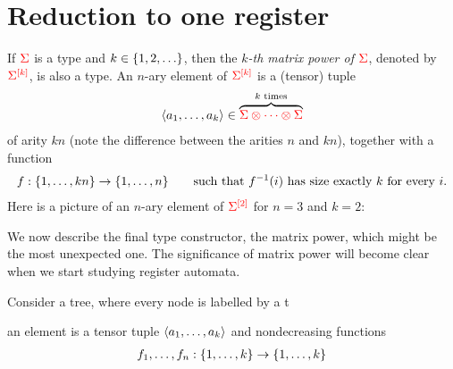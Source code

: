 \section{Reduction to one register}
\label{sec:matrix-power}

\begin{proposition}
    \label{prop:many-register} 
\end{proposition}


\begin{definition}
    If  ${\color{red}{\Sigma}}$ is a type and $k \in \{1,2,\ldots\}$, then the \emph{$k$-th matrix power of ${\color{red}{\Sigma}}$}, denoted by ${\color{red}{\Sigma^{[k]}}}$, is also a type.  An $n$-ary element of ${\color{red}{\Sigma^{[k]}}}$ is a (tensor) tuple
    \begin{align*}
        \langle{a_1,\ldots,a_k}\rangle \in \overbrace{{\color{red}{\Sigma \otimes \cdots \otimes \Sigma}}}^{\text{$k$ times}} 
    \end{align*}
    of arity $kn$ (note the difference between the arities $n$ and $kn$), together with a function
    \begin{align*}
        f : \{1,\ldots,kn\} \to \{1,\ldots,n\} \qquad \text{such that $f^{-1}(i)$ has size exactly $k$ for every $i$.}
    \end{align*}
    Here is a picture of an $n$-ary element of  ${\color{red}{\Sigma^{[2]}}}$ for $n=3$ and $k=2$:
\end{definition}
  
We now describe the final type constructor, the matrix power, which might be the most unexpected one. The significance of matrix power will become clear when we start studying register automata.  

Consider a tree, where every node is labelled by a t

an element is a tensor tuple $\langle{a_1,\ldots,a_k}\rangle$ and nondecreasing functions 
\begin{align*}
    f_1,\ldots,f_n : \{1,\ldots,k\} \to \{1,\ldots,k\}
\end{align*}

